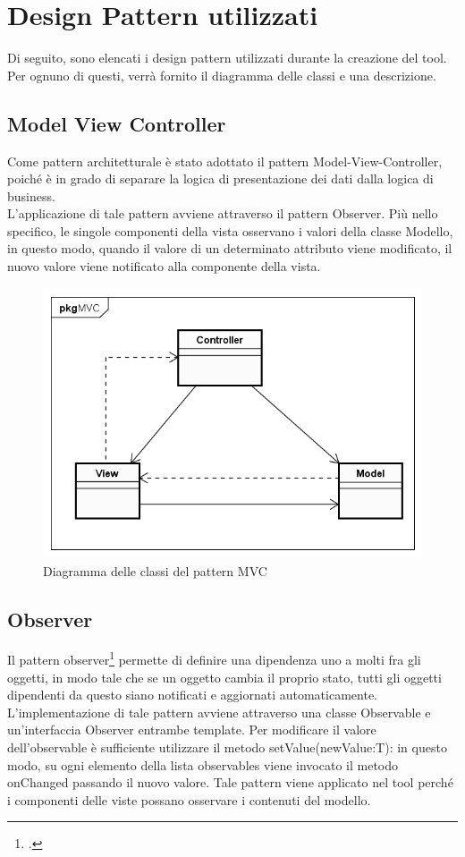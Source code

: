 
\section{Design Pattern utilizzati}\label{sec:design-pattern-utilizzati}
Di seguito, sono elencati i design pattern utilizzati durante la creazione del tool. Per ognuno di questi, verrà fornito il diagramma delle classi e una descrizione.
\subsection{Model View Controller}\label{subsec:model-view-controller}
Come pattern architetturale è stato adottato il pattern Model-View-Controller, poiché è in grado di separare la logica di presentazione dei dati dalla logica di business.\\
L’applicazione di tale pattern avviene attraverso il pattern Observer.
Più nello specifico, le singole componenti della vista osservano i valori della classe Modello, in questo modo, quando il valore di un determinato attributo viene modificato, il nuovo valore viene notificato alla componente della vista.

\begin{figure}[H]
    \centering
    \includegraphics[width=13cm, height=8cm]{./immagini/diagrammi_uml/mvc.png}
    \caption{Diagramma delle classi del pattern MVC}\label{fig:mvc}
\end{figure}

\newpage
\subsection{Observer}\label{subsec:observer}
Il pattern observer\footcite{womak:observer} permette di definire una dipendenza uno a molti fra gli
oggetti, in modo tale che se un oggetto cambia il proprio stato, tutti gli oggetti
dipendenti da questo siano notificati e aggiornati automaticamente.
L’implementazione di tale pattern avviene attraverso una classe Observable e un’interfaccia Observer entrambe template.
Per modificare il valore dell’observable è sufficiente utilizzare il metodo setValue(newValue:T): in questo modo, su ogni elemento della lista observables viene invocato il metodo onChanged passando il nuovo valore.
Tale pattern viene applicato nel tool perché i componenti delle viste possano osservare i contenuti del modello.

